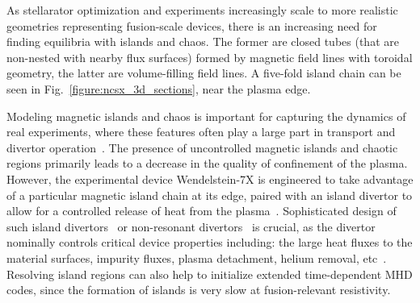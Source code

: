 \documentclass[%
 reprint,
 superscriptaddress,
 amsmath,amssymb,
 aps, nofootinbib, floatfix]{revtex4-2}
\begin{document}
As stellarator optimization and experiments increasingly scale to more realistic geometries representing fusion-scale devices, there is an increasing need for finding equilibria with islands and chaos. The former are closed tubes (that are non-nested with nearby flux surfaces) formed by magnetic field lines with toroidal geometry, the latter are volume-filling field lines. A five-fold island chain can be seen in Fig.~\ref{figure:ncsx_3d_sections}, near the plasma edge.

Modeling magnetic islands and chaos is important for capturing the dynamics of real experiments, where these features often play a large part in transport and divertor operation~\cite{coelho_global_2022}. The presence of uncontrolled magnetic islands and chaotic regions primarily leads to a decrease in the quality of confinement of the plasma. However, the experimental device Wendelstein-7X is engineered to take advantage of a particular magnetic island chain at its edge, paired with an island divertor to allow for a controlled release of heat from the plasma~\cite{pedersen_confirmation_2016}. Sophisticated design of such island divertors~\cite{feng_understanding_2021} or non-resonant divertors~\cite{boozer_simulation_2018, garcia_exploration_2023} is crucial, as the divertor nominally controls critical device properties including: the large heat fluxes to the material surfaces, impurity fluxes, plasma detachment, helium removal, etc~\cite{janeschitz_iter_1995, kessel_overview_2018}. Resolving island regions can also help to initialize extended time-dependent MHD codes, since the formation of islands is very slow at fusion-relevant resistivity. 
\end{document}
